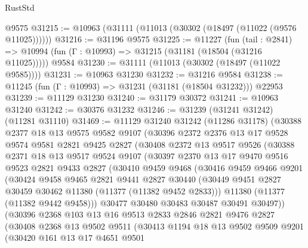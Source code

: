 \begin{lexlean}{RustStd}
\begin{coremodule}
    @9575
@31215 := @10963 (@31111 (@11013 (@30302 (@18497 (@11022 (@9576 @11025))))))
@31216 := @31196 @9575
@31225 := @11227
    (fun (tail : @2841) => @10994 (fun (Γ : @10993) => @31215 (@31181 (@18504 (@31216 @11025)))))
    @9584
@31230 := @31111 (@11013 (@30302 (@18497 (@11022 @9585))))
@31231 := @10963 @31230
@31232 := @31216 @9584
@31238 := @11245 (fun (Γ : @10993) => @31231 (@31181 (@18504 @31232))) @22953
@31239 := @11129 @31230
@31240 := @31179 @30372
@31241 := @10963 @31240
@31242 := @30376 @31232
@31246 := @31239 (@31241 @31242) (@11281 @31110)
@31469 := @11129
    @31240
    @31242
    (@11286 @31178)
    (@30388
      @2377
      @18
      @13
      @9575
      @9582
      @9107
      (@30396
        @2372
        @2376
        @13
        @17
        @9528
        @9574
        @9581
        @2821
        @9425
        @2827
        (@30408
          @2372
          @13
          @9517
          @9526
          (@30388
            @2371
            @18
            @13
            @9517
            @9524
            @9107
            (@30397
              @2370
              @13
              @17
              @9470
              @9516
              @9523
              @2821
              @9433
              @2827
              (@30410
                @9459
                @9468
                (@30416
                  @9459
                  @9466
                  @9201
                  (@30424
                    @9458
                    @9465
                    @2821
                    @9441
                    @2827
                    @30440
                    (@30449 @9451 @2827 @30459 @30462 @11380 (@11377 (@11382 @9452 @2833)))
                    @11380
                    (@11377 (@11382 @9442 @9458)))
                  @30477
                  @30480
                  @30483
                  @30487
                  @30491
                  @30497))
              (@30396
                @2368
                @103
                @13
                @16
                @9513
                @2833
                @2846
                @2821
                @9476
                @2827
                (@30408
                  @2368
                  @13
                  @9502
                  @9511
                  (@30413
                    @1194
                    @18
                    @13
                    @9502
                    @9509
                    @9201
                    (@30420
                      @161
                      @13
                      @17
                      @4651
                      @9501

\end{coremodule}
\end{lexlean}
